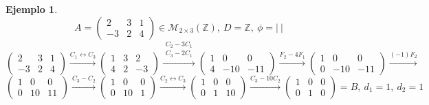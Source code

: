 \documentclass{article}
\theoremstyle{theorem-style}  %
\theoremstyle{definition}
\theoremstyle{example-style}
\newtheorem{example}{Ejemplo}[section]
\begin{document}
	\begin{example}
		\[ A = \begin{pmatrix}
				2 & 3 & 1 \\
				-3 & 2 & 4
		\end{pmatrix} \in \mathcal{M}_{2\times 3}(\mathbb{Z}), \ D=\mathbb{Z}, \ \phi=|\ |\]
		\[ \begin{pmatrix}
			2 & 3 & 1 \\
			-3 & 2 & 4
		\end{pmatrix} \xrightarrow{C_1\leftrightarrow C_3} \begin{pmatrix}
			1 & 3 & 2 \\
			4 & 2 & -3
			\end{pmatrix}\xrightarrow{\substack{C_2-3C_1\\C_3-2C_1}} \begin{pmatrix}
			1 & 0 & 0 \\
			4 & -10 & -11
			\end{pmatrix}\xrightarrow{F_2-4F_1}\begin{pmatrix}
			1 & 0 & 0 \\
			0 & -10 & -11
		\end{pmatrix}
	\xrightarrow{(-1)F_2}\] 
		\[\begin{pmatrix}
			1 & 0 & 0 \\
			0 & 10 & 11
		\end{pmatrix}
		\xrightarrow{C_3-C_2} \begin{pmatrix}
			1 & 0 & 0 \\
			0 & 10 & 1
		\end{pmatrix}
		\xrightarrow{C_2\leftrightarrow C_3} \begin{pmatrix}
			1 & 0 & 0 \\
			0 & 1 & 10
		\end{pmatrix}
		\xrightarrow{C_3-10C_2}\begin{pmatrix}
			1 & 0 & 0 \\
			0 & 1 & 0
	\end{pmatrix}=B, \ d_1=1, \ d_2=1 \]


\end{example}
\end{document}
